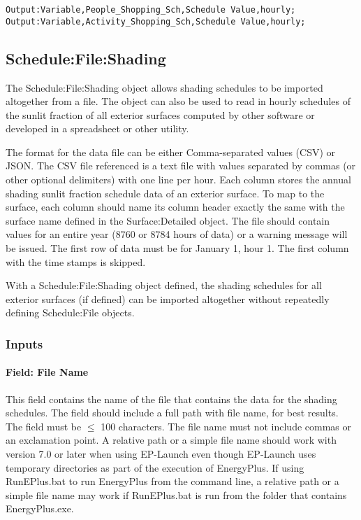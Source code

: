 \begin{lstlisting}
Output:Variable,People_Shopping_Sch,Schedule Value,hourly;
Output:Variable,Activity_Shopping_Sch,Schedule Value,hourly;
\end{lstlisting}

\subsection{Schedule:File:Shading}\label{schedulefileshading}

The Schedule:File:Shading object allows shading schedules to be imported altogether from a file. The object can also be used to read in hourly schedules of the sunlit fraction of all exterior surfaces computed by other software or developed in a spreadsheet or other utility.

The format for the data file can be either Comma-separated values (CSV) or JSON. The CSV file referenced is a text file with values separated by commas (or other optional delimiters) with one line per hour. Each column stores the annual shading sunlit fraction schedule data of an exterior surface. To map to the surface, each column should name its column header exactly the same with the surface name defined in the Surface:Detailed object. The file should contain values for an entire year (8760 or 8784 hours of data) or a warning message will be issued. The first row of data must be for January 1, hour 1. The first column with the time stamps is skipped.

With a Schedule:File:Shading object defined, the shading schedules for all exterior surfaces (if defined) can be imported altogether without repeatedly defining Schedule:File objects.

\subsubsection{Inputs}\label{inputs-schedule-file-shading}

\paragraph{Field: File Name}\label{field-file-name}

This field contains the name of the file that contains the data for the shading schedules. The field should include a full path with file name, for best results. The field must be \(\le\) 100 characters. The file name must not include commas or an exclamation point. A relative path or a simple file name should work with version 7.0 or later when using EP-Launch even though EP-Launch uses temporary directories as part of the execution of EnergyPlus. If using RunEPlus.bat to run EnergyPlus from the command line, a relative path or a simple file name may work if RunEPlus.bat is run from the folder that contains EnergyPlus.exe.

